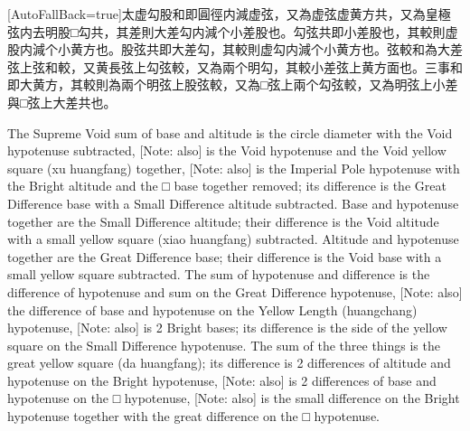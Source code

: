 \documentclass[11pt]{article}
\newcommand{\zhsmall}{\footnotesize\color{black!70}}
\newcommand{\unitlabel}[1]{\marginpar{\raggedleft\tiny\color{gray}#1}}
\newenvironment{unitzh}{\par\CJKfontspec{Noto Serif CJK SC}[AutoFallBack=true]\large\linespread{1.25}\selectfont}{\par}
\newenvironment{uniten}{\par\small\color{black!85}}{\par\medskip}
\begin{document}
\begin{unitzh}\unitlabel{ceyuan-003.5}太虚勾股和即圓徑内減虚弦，{\zhsmall 又}為虚弦虚黄方共，{\zhsmall 又}為皇極弦内去明股□勾共，其差則大差勾内減个小差股也。勾弦共即小差股也，其較則虚股内減个小黄方也。股弦共即大差勾，其較則虚勾内減个小黄方也。弦較和為大差弦上弦和較，{\zhsmall 又}黄長弦上勾弦較，{\zhsmall 又}為兩个明勾，其較小差弦上黄方面也。三事和即大黄方，其較則為兩个明弦上股弦較，{\zhsmall 又}為□弦上兩个勾弦較，{\zhsmall 又}為明弦上小差與□弦上大差共也。\end{unitzh}
\begin{uniten}The Supreme Void sum of base and altitude is the circle diameter with the Void hypotenuse subtracted, [Note: also] is the Void hypotenuse and the Void yellow square (xu huangfang) together, [Note: also] is the Imperial Pole hypotenuse with the Bright altitude and the □ base together removed; its difference is the Great Difference base with a Small Difference altitude subtracted. Base and hypotenuse together are the Small Difference altitude; their difference is the Void altitude with a small yellow square (xiao huangfang) subtracted. Altitude and hypotenuse together are the Great Difference base; their difference is the Void base with a small yellow square subtracted. The sum of hypotenuse and difference is the difference of hypotenuse and sum on the Great Difference hypotenuse, [Note: also] the difference of base and hypotenuse on the Yellow Length (huangchang) hypotenuse, [Note: also] is 2 Bright bases; its difference is the side of the yellow square on the Small Difference hypotenuse. The sum of the three things is the great yellow square (da huangfang); its difference is 2 differences of altitude and hypotenuse on the Bright hypotenuse, [Note: also] is 2 differences of base and hypotenuse on the □ hypotenuse, [Note: also] is the small difference on the Bright hypotenuse together with the great difference on the □ hypotenuse.\end{uniten}
\end{document}
